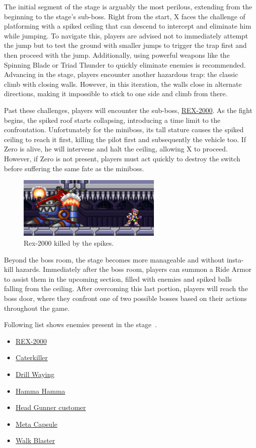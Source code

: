 The initial segment of the stage is arguably the most perilous, extending from the beginning to the stage's sub-boss. Right from the start, X faces the challenge of platforming with a spiked ceiling that can descend to intercept and eliminate him while jumping. To navigate this, players are advised not to immediately attempt the jump but to test the ground with smaller jumps to trigger the trap first and then proceed with the jump. Additionally, using powerful weapons like the Spinning Blade or Triad Thunder to quickly eliminate enemies is recommended. Advancing in the stage, players encounter another hazardous trap: the classic climb with closing walls. However, in this iteration, the walls close in alternate directions, making it impossible to stick to one side and climb from there.

Past these challenges, players will encounter the sub-boss, \hyperlink{miniboss:REX}{REX-2000}. As the fight begins, the spiked roof starts collapsing, introducing a time limit to the confrontation. Unfortunately for the miniboss, its tall stature causes the spiked ceiling to reach it first, killing the pilot first and subsequently the vehicle too. If Zero is alive, he will intervene and halt the ceiling, allowing X to proceed. However, if Zero is not present, players must act quickly to destroy the switch before suffering the same fate as the miniboss.
\begin{figure}[htp]
	\centering
	\includegraphics[height=3cm]{figures/X3/Doppler_stages/drex_kill.jpg}
	\caption{Rex-2000 killed by the spikes.}
\end{figure}
Beyond the boss room, the stage becomes more manageable and without insta-kill hazards. Immediately after the boss room, players can summon a Ride Armor to assist them in the upcoming section, filled with enemies and spiked balls falling from the ceiling. After overcoming this last portion, players will reach the boss door, where they confront one of two possible bosses based on their actions throughout the game.

Following list shows enemies present in the stage~\cite{wiki:Doppler_stage}.
\begin{itemize}
	\item \hyperlink{miniboss:REX}{REX-2000}
	\item \hyperlink{enem:Caterkiller}{Caterkiller}
	\item \hyperlink{enem:Drill_Waying}{Drill Waying}
	\item \hyperlink{enem:Hamma_Hamma}{Hamma Hamma}
	\item \hyperlink{enem:Head_Gunner_customer}{Head Gunner customer}
	\item \hyperlink{enem:Meta_Capsule}{Meta Capsule}
	\item \hyperlink{enem:Walk_Blaster}{Walk Blaster}
	
\end{itemize}


